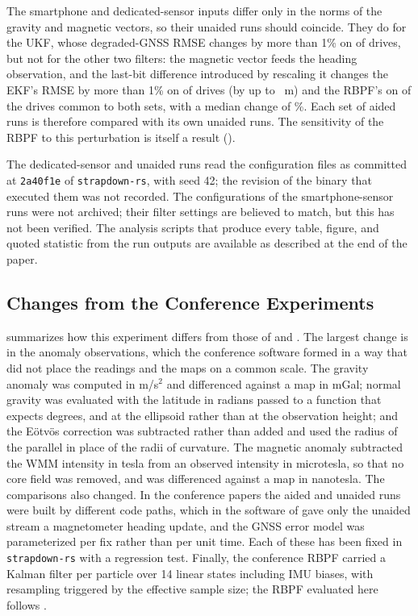 The smartphone and dedicated-sensor inputs differ only in the norms of the gravity and magnetic vectors, so their unaided runs should coincide. They do for the UKF, whose degraded-GNSS RMSE changes by more than 1\% on \numsensukfcount{} of \numsensukfn{} drives, but not for the other two filters: the magnetic vector feeds the heading observation, and the last-bit difference introduced by rescaling it changes the EKF's RMSE by more than 1\% on \numsensekfcount{} of \numsensekfn{} drives (by up to \numsensekfmaxm~m) and the RBPF's on \numsensrbpfcount{} of the \numsensrbpfn{} drives common to both sets, with a median change of \numsensrbpfmedianpct\%. Each set of aided runs is therefore compared with its own unaided runs. The sensitivity of the RBPF to this perturbation is itself a result ().

The dedicated-sensor and unaided runs read the configuration files as committed at \texttt{2a40f1e} of \texttt{strapdown-rs}, with seed 42; the revision of the binary that executed them was not recorded. The configurations of the smartphone-sensor runs were not archived; their filter settings are believed to match, but this has not been verified. The analysis scripts that produce every table, figure, and quoted statistic from the run outputs are available as described at the end of the paper.

\subsection{Changes from the Conference Experiments}
\label{sec:changes}

 summarizes how this experiment differs from those of \citet{anom-ukf} and \citet{anom-pf}. The largest change is in the anomaly observations, which the conference software formed in a way that did not place the readings and the maps on a common scale. The gravity anomaly was computed in m/s\(^2\) and differenced against a map in mGal; normal gravity was evaluated with the latitude in radians passed to a function that expects degrees, and at the ellipsoid rather than at the observation height; and the E\"{o}tv\"{o}s correction was subtracted rather than added and used the radius of the parallel in place of the radii of curvature. The magnetic anomaly subtracted the WMM intensity in tesla from an observed intensity in microtesla, so that no core field was removed, and was differenced against a map in nanotesla. The comparisons also changed. In the conference papers the aided and unaided runs were built by different code paths, which in the software of \citet{anom-pf} gave only the unaided stream a magnetometer heading update, and the GNSS error model was parameterized per fix rather than per unit time. Each of these has been fixed in \texttt{strapdown-rs} with a regression test. Finally, the conference RBPF carried a Kalman filter per particle over 14 linear states including IMU biases, with resampling triggered by the effective sample size; the RBPF evaluated here follows \citet{canciani2017airborne}.

